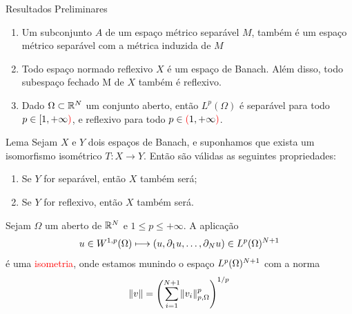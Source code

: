 \begin{frame}{Resultados Preliminares}
\begin{enumerate}[a]
\item Um subconjunto \(A\) de um espaço métrico separável \(M\), também é um espaço métrico separável com a métrica induzida de \(M\)

\item Todo espaço normado reflexivo \(X\) é um espaço de Banach. Além disso, todo {\color{red}subespaço fechado} M de \(X\) também é reflexivo.

\item Dado \(\Omega\subset \mathbb{R}^N\) um conjunto aberto, então \(L^p(\Omega)\) é separável para todo \(p\in [1,+\infty{\color{red})}\), e reflexivo para todo \(p\in {\color{red}(}1,+\infty{\color{red})}\).
\end{enumerate}

\begin{block}{Lema}
Sejam \(X\) e \(Y\) dois espaços de Banach, e suponhamos que exista um {\color{red}isomorfismo isométrico} \(T:X\longrightarrow Y\). Então são válidas as seguintes propriedades:
\begin{enumerate}[a]
\item Se \(Y\) for separável, então \(X\) também será;
\item Se \(Y\) for reflexivo, então \(X\) também será.
\end{enumerate}
\end{block}

\end{frame}


\begin{frame}

\begin{lema}
	Sejam $\Omega$ um aberto de $\mathbb{R}^N$ e $1\leq p\leq +\infty$. A aplicação 
	\[u\in W^{1,p}(\Omega)\longmapsto (u,\partial_1 u,\ldots,\partial_N u)\in L^p(\Omega)^{N+1}\]
	é uma \textcolor{red}{ isometria}, onde estamos munindo o espaço $L^p(\Omega)^{N+1}$ com a norma
	\[\lVert v\rVert=\left(\sum_{i=1}^{N+1}\lVert v_i\rVert_{p,\Omega}^p\right)^{1/p}\]
\end{lema}
\end{frame}

